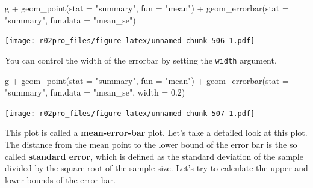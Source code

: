 \documentclass[
]{book}
\newenvironment{Shaded}{\begin{snugshade}}{\end{snugshade}}
\newcommand{\AttributeTok}[1]{\textcolor[rgb]{0.77,0.63,0.00}{#1}}
\newcommand{\CommentTok}[1]{\textcolor[rgb]{0.56,0.35,0.01}{\textit{#1}}}
\newcommand{\FloatTok}[1]{\textcolor[rgb]{0.00,0.00,0.81}{#1}}
\newcommand{\FunctionTok}[1]{\textcolor[rgb]{0.00,0.00,0.00}{#1}}
\newcommand{\NormalTok}[1]{#1}
\newcommand{\OtherTok}[1]{\textcolor[rgb]{0.56,0.35,0.01}{#1}}
\newcommand{\SpecialCharTok}[1]{\textcolor[rgb]{0.00,0.00,0.00}{#1}}
\newcommand{\StringTok}[1]{\textcolor[rgb]{0.31,0.60,0.02}{#1}}
\begin{document}
\begin{Shaded}
\begin{Highlighting}[]
\NormalTok{g  }\SpecialCharTok{+} \FunctionTok{geom\_point}\NormalTok{(}\AttributeTok{stat =} \StringTok{"summary"}\NormalTok{, }\AttributeTok{fun =} \StringTok{"mean"}\NormalTok{) }\SpecialCharTok{+} 
  \FunctionTok{geom\_errorbar}\NormalTok{(}\AttributeTok{stat =} \StringTok{"summary"}\NormalTok{, }\AttributeTok{fun.data =} \StringTok{"mean\_se"}\NormalTok{) }
\end{Highlighting}
\end{Shaded}

\texttt{[image: r02pro\_files/figure-latex/unnamed-chunk-506-1.pdf]}

You can control the width of the errorbar by setting the \texttt{width} argument.

\begin{Shaded}
\begin{Highlighting}[]
\NormalTok{g  }\SpecialCharTok{+} \FunctionTok{geom\_point}\NormalTok{(}\AttributeTok{stat =} \StringTok{"summary"}\NormalTok{, }\AttributeTok{fun =} \StringTok{"mean"}\NormalTok{) }\SpecialCharTok{+} 
  \FunctionTok{geom\_errorbar}\NormalTok{(}\AttributeTok{stat =} \StringTok{"summary"}\NormalTok{, }\AttributeTok{fun.data =} \StringTok{"mean\_se"}\NormalTok{, }\AttributeTok{width =} \FloatTok{0.2}\NormalTok{)}
\end{Highlighting}
\end{Shaded}

\texttt{[image: r02pro\_files/figure-latex/unnamed-chunk-507-1.pdf]}

This plot is called a \textbf{mean-error-bar} plot. Let's take a detailed look at this plot. The distance from the mean point to the lower bound of the error bar is the so called \textbf{standard error}, which is defined as the standard deviation of the sample divided by the square root of the sample size. Let's try to calculate the upper and lower bounds of the error bar.

\begin{Shaded}
\end{Shaded}
\end{document}
